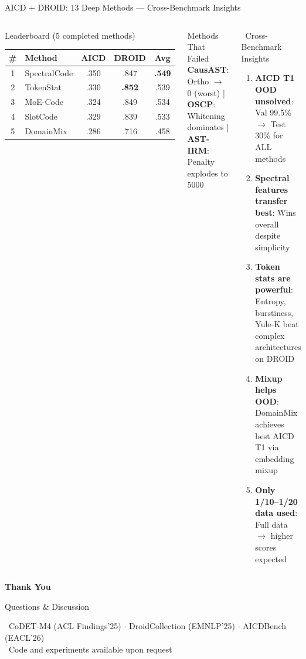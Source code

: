 \documentclass[aspectratio=169, 10pt]{beamer}
\begin{document}
\begin{frame}{AICD + DROID: 13 Deep Methods --- Cross-Benchmark Insights}
\vspace{-0.2cm}
\begin{columns}[T]
\begin{block}{Leaderboard (5 completed methods)}
\centering\scriptsize
\begin{tabular}{clccc}
\toprule
\textbf{\#} & \textbf{Method} & \textbf{AICD} & \textbf{DROID} & \textbf{Avg} \\
\midrule
\rowcolor{oursgreen}
1 & SpectralCode & .350 & .847 & \textbf{.549} \\
2 & TokenStat & .330 & \textbf{.852} & .539 \\
3 & MoE-Code & .324 & .849 & .534 \\
4 & SlotCode & .329 & .839 & .533 \\
5 & DomainMix & .286 & .716 & .458 \\
\bottomrule
\end{tabular}
\end{block}

\begin{alertblock}{\scriptsize Methods That Failed}
\scriptsize
\textbf{CausAST}: Ortho $\to$ 0 (worst) | \textbf{OSCP}: Whitening dominates | \textbf{AST-IRM}: Penalty explodes to 5000
\end{alertblock}

\begin{exampleblock}{\faLightbulb\ Cross-Benchmark Insights}
\small
\begin{enumerate}\setlength\itemsep{3pt}
    \item \textbf{AICD T1 OOD unsolved}: Val 99.5\% $\to$ Test 30\% for ALL methods
    \item \textbf{Spectral features transfer best}: Wins overall despite simplicity
    \item \textbf{Token stats are powerful}: Entropy, burstiness, Yule-K beat complex architectures on DROID
    \item \textbf{Mixup helps OOD}: DomainMix achieves best AICD T1 via embedding mixup
    \item \textbf{Only 1/10--1/20 data used}: Full data $\to$ higher scores expected
\end{enumerate}
\end{exampleblock}
\end{columns}
\end{frame}


\begin{frame}{}
\vspace{1.5cm}
\begin{center}
{\Huge \textbf{Thank You}}
\vspace{0.8cm}

{\Large Questions \& Discussion}
\vspace{1cm}

{\small
\faDatabase\ CoDET-M4 {\tiny(ACL Findings'25)} $\cdot$ DroidCollection {\tiny(EMNLP'25)} $\cdot$ AICDBench {\tiny(EACL'26)} \\[4pt]
\faGithub\ Code and experiments available upon request
}
\end{center}
\end{frame}
\end{document}
